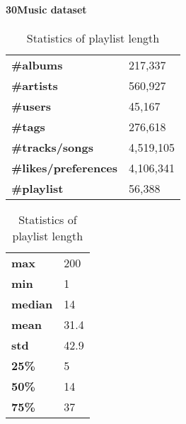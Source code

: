 \paragraph{30Music dataset~\cite{turrin201530music}}

\begin{table}
\begin{minipage}[c]{.5\textwidth}
\caption{Statistics of the 30Music dataset}
\label{tab:30music_stats}
\centering
\begin{tabular}{l|l} \hline
\textbf{\#albums}            & 217,337   \\
\textbf{\#artists}           & 560,927   \\
\textbf{\#users}             & 45,167    \\
\textbf{\#tags}              & 276,618   \\
\textbf{\#tracks/songs}      & 4,519,105 \\
\textbf{\#likes/preferences} & 4,106,341 \\
\textbf{\#playlist}          & 56,388    \\ \hline
\end{tabular}
\end{minipage}
\hfill
\begin{minipage}[c]{.5\textwidth}
\caption{Statistics of playlist length}
\label{tab:30music_playlist}
\centering
\begin{tabular}{l|l} \hline
\textbf{max}    & 200   \\
\textbf{min}    & 1     \\
\textbf{median} & 14    \\
\textbf{mean}   & 31.4  \\
\textbf{std}    & 42.9  \\
\textbf{25\%}   & 5     \\
\textbf{50\%}   & 14    \\
\textbf{75\%}   & 37    \\ \hline
\end{tabular}
\end{minipage}
\end{table}

